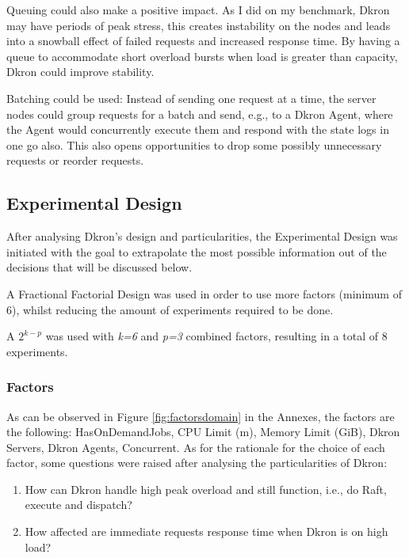 \documentclass[runningheads]{llncs}
\begin{document}
Queuing could also make a positive impact. As I did on my benchmark, Dkron may have periods of peak stress,
this creates instability on the nodes and leads into a snowball effect of failed requests and increased
response time. By having a queue to accommodate short overload bursts when load is greater than capacity,
Dkron could improve stability.

Batching could be used: Instead of sending one request at a time, the server nodes could group requests for a batch
and send, e.g., to a Dkron Agent, where the Agent would concurrently execute them and respond with the state logs
in one go also. This also opens opportunities to drop some possibly unnecessary requests or reorder requests.


\subsection{Experimental Design}
After analysing Dkron's design and particularities, the Experimental Design was initiated with the
goal to extrapolate the most possible information out of the decisions that will be discussed below.

A Fractional Factorial Design was used in order to use more factors (minimum of 6), whilst reducing
the amount of experiments required to be done.

A $2^{k-p}$ was used with \textit{k=6} and \textit{p=3} combined factors, resulting
in a total of 8 experiments.

\subsubsection{Factors}

As can be observed in Figure \ref{fig:factorsdomain} in the Annexes, the factors are the following: HasOnDemandJobs, CPU Limit (m),
Memory Limit (GiB), Dkron Servers, Dkron Agents, Concurrent.
As for the rationale for the choice of each factor, some questions were raised
after analysing the particularities of Dkron:
\begin{enumerate}
    \item How can Dkron handle high peak overload and still function, i.e., do Raft, execute and
    dispatch?
    \item How affected are immediate requests response time when Dkron is on high load?
\end{enumerate}
\end{document}
